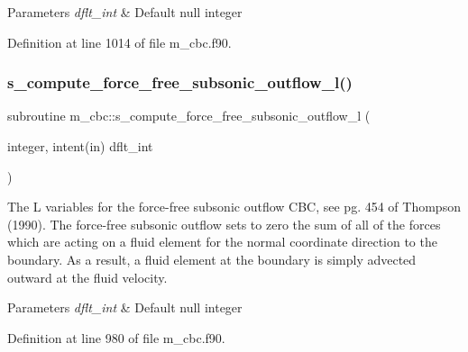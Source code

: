 \begin{DoxyParams}{Parameters}
{\em dflt\+\_\+int} & Default null integer \\
\hline
\end{DoxyParams}


Definition at line 1014 of file m\+\_\+cbc.\+f90.

\mbox{\label{namespacem__cbc_ab95f6f268802b6330f4aef16685ae498}} 
\subsubsection{\texorpdfstring{s\+\_\+compute\+\_\+force\+\_\+free\+\_\+subsonic\+\_\+outflow\+\_\+l()}{s\_compute\_force\_free\_subsonic\_outflow\_l()}}
{\footnotesize\ttfamily subroutine m\+\_\+cbc\+::s\+\_\+compute\+\_\+force\+\_\+free\+\_\+subsonic\+\_\+outflow\+\_\+l (\begin{DoxyParamCaption}\item[{integer, intent(in)}]{dflt\+\_\+int }\end{DoxyParamCaption})}



The L variables for the force-\/free subsonic outflow C\+BC, see pg. 454 of Thompson (1990). The force-\/free subsonic outflow sets to zero the sum of all of the forces which are acting on a fluid element for the normal coordinate direction to the boundary. As a result, a fluid element at the boundary is simply advected outward at the fluid velocity. 


\begin{DoxyParams}{Parameters}
{\em dflt\+\_\+int} & Default null integer \\
\hline
\end{DoxyParams}


Definition at line 980 of file m\+\_\+cbc.\+f90.

\mbox{\label{namespacem__cbc_a39d803573d65c9c8ba7cc8b44b8053e1}} 

